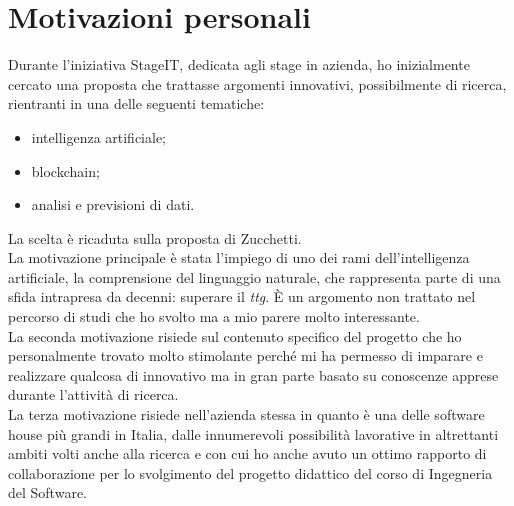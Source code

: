 \section{Motivazioni personali}
Durante l'iniziativa StageIT, dedicata agli stage in azienda, ho inizialmente cercato una proposta che trattasse argomenti innovativi, possibilmente di ricerca, rientranti in una delle seguenti tematiche:
\begin{itemize}
	\item intelligenza artificiale;
	\item blockchain;
	\item analisi e previsioni di dati.
\end{itemize}
La scelta è ricaduta sulla proposta di Zucchetti. \\
La motivazione principale è stata l'impiego di uno dei rami dell'intelligenza artificiale, la comprensione del linguaggio naturale, che rappresenta parte di una sfida intrapresa da decenni: superare il \emph{\gls{ttg}}\glsfirstoccur. È un argomento non trattato nel percorso di studi che ho svolto ma a mio parere molto interessante. \\
La seconda motivazione risiede sul contenuto specifico del progetto che ho personalmente trovato molto stimolante perché mi ha permesso di imparare e realizzare qualcosa di innovativo ma in gran parte basato su conoscenze apprese durante l'attività di ricerca. \\
La terza motivazione risiede nell'azienda stessa in quanto è una delle software house più grandi in Italia, dalle innumerevoli possibilità lavorative in altrettanti ambiti volti anche alla ricerca e con cui ho anche avuto un ottimo rapporto di collaborazione per lo svolgimento del progetto didattico del corso di Ingegneria del Software.